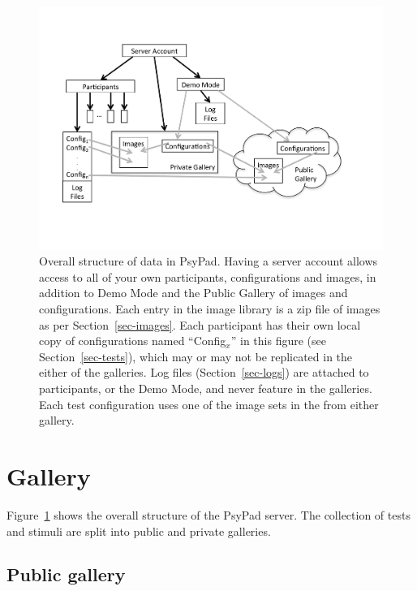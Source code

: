 \documentclass{article}
\begin{document}
\begin{figure}
\begin{center}
\includegraphics[scale=0.6]{Overview3_cropped.pdf}

\caption{\label{fig-overview}Overall structure of data in PsyPad.
Having a server account allows access to all of your own 
participants, configurations and images, in addition to Demo Mode
and the Public Gallery of images and configurations.
Each entry in the image library is a zip file of images as per
Section~\ref{sec-images}. Each participant has their own local copy
of configurations named ``Config$_x$'' in this figure (see Section~\ref{sec-tests}), 
which may or may not be replicated in the either of the galleries.
Log files (Section~\ref{sec-logs})
are attached to participants, or the Demo Mode, and never feature 
in the galleries.
Each test configuration uses one of the image sets in
the from either gallery. 
}

\end{center}
\end{figure}

\section{Gallery}

Figure~\ref{fig-overview} shows the overall structure of the PsyPad server.
The collection of tests and
stimuli are split into public and private galleries.


\subsection{Public gallery}
\label{sec-publicGallery}
\end{document}
